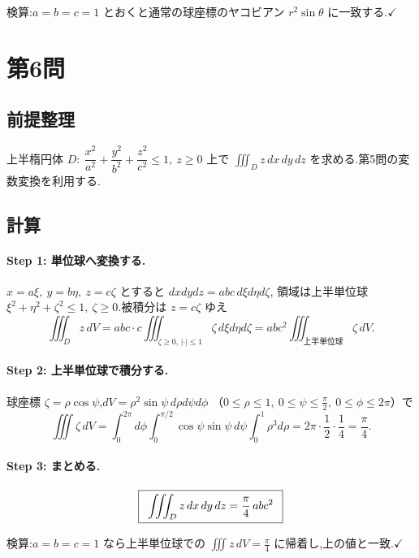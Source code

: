 \documentclass[11pt,a4paper]{article}
\begin{document}
検算:$a=b=c=1$ とおくと通常の球座標のヤコビアン $r^2\sin\theta$ に一致する.$\checkmark$

\section*{第6問}

\subsection*{前提整理}

上半楕円体 $D:\ \dfrac{x^2}{a^2}+\dfrac{y^2}{b^2}+\dfrac{z^2}{c^2}\le1,\ z\ge0$ 上で
$\displaystyle\iiint_D z\,dx\,dy\,dz$ を求める.第5問の変数変換を利用する.

\subsection*{計算}

\paragraph{Step 1: 単位球へ変換する.}
$x=a\xi,\ y=b\eta,\ z=c\zeta$ とすると $dxdydz=abc\,d\xi d\eta d\zeta$,
領域は上半単位球 $\xi^2+\eta^2+\zeta^2\le1,\ \zeta\ge0$.被積分は $z=c\zeta$ ゆえ
\[
\iiint_D z\,dV=abc\cdot c\iiint_{\zeta\ge0,\,|\cdot|\le1}\zeta\,d\xi d\eta d\zeta
=abc^2\iiint_{\text{上半単位球}}\zeta\,dV.
\]

\paragraph{Step 2: 上半単位球で積分する.}
球座標 $\zeta=\rho\cos\psi$,$dV=\rho^2\sin\psi\,d\rho d\psi d\phi$
（$0\le\rho\le1,\ 0\le\psi\le\frac\pi2,\ 0\le\phi\le2\pi$）で
\[
\iiint\zeta\,dV
=\int_0^{2\pi}\!\!d\phi\int_0^{\pi/2}\!\!\cos\psi\sin\psi\,d\psi\int_0^1\!\rho^3 d\rho
=2\pi\cdot\frac12\cdot\frac14=\frac{\pi}{4}.
\]

\paragraph{Step 3: まとめる.}
\[
\boxed{\,\ \iiint_D z\,dx\,dy\,dz=\frac{\pi}{4}\,abc^2\ \,}
\]

検算:$a=b=c=1$ なら上半単位球での $\iiint z\,dV=\frac{\pi}{4}$ に帰着し,上の値と一致.$\checkmark$

\end{document}

